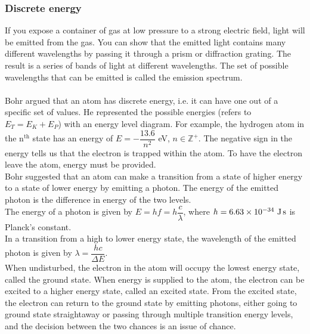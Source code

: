 \subsubsection*{Discrete energy}
If you expose a container of gas at low pressure to a strong electric field, light will be emitted from the gas. You can show that the emitted light contains many different wavelengths by passing it through a prism or diffraction grating. The result is a series of bands of light at different wavelengths. The set of possible wavelengths that can be emitted is called the emission spectrum.\\\\
Bohr argued that an atom has discrete energy, i.e. it can have one out of a specific set of values. He represented the possible energies (refers to $E_T=E_K+E_P$) with an energy level diagram. For example, the hydrogen atom in the n$^\text{th}$ state has an energy of $E=-\dfrac{13.6}{n^2}$ eV, $n\in \mathbb{Z^+}$. The negative sign in the energy tells us that the electron is trapped within the atom. To have the electron leave the atom, energy must be provided.\\
Bohr suggested that an atom can make a transition from a state of higher energy to a state of lower energy by emitting a photon. The energy of the emitted photon is the difference in energy of the two levels. \\
The energy of a photon is given by $E=hf=h\dfrac{c}{\lambda}$, where $h=6.63\times 10^{-34}\ \text{J\,s}$ is Planck's constant.\\
In a transition from a high to lower energy state, the wavelength of the emitted photon is given by $\lambda=\dfrac{hc}{\Delta E}$.\\
When undisturbed, the electron in the atom will occupy the lowest energy state, called the ground state. When energy is supplied to the atom, the electron can be excited to a higher energy state, called an excited state. From the excited state, the electron can return to the ground state by emitting photons, either going to ground state straightaway or passing through multiple transition energy levels, and the decision between the two chances is an issue of chance.
